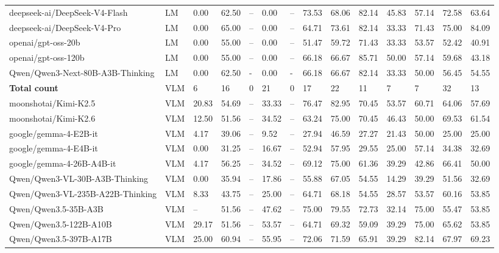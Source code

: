 \begin{table}[htbp!]
\begin{adjustbox}{max width=\textwidth}
\begin{tabular}{llllllllllllll}
deepseek-ai/DeepSeek-V4-Flash & LM & 0.00  & 62.50 & -- & 0.00 & -- & 73.53 & 68.06 & 82.14 & 45.83 & 57.14 & 72.58 & 63.64    \\
deepseek-ai/DeepSeek-V4-Pro & LM & 0.00 & 65.00 & -- & 0.00 & -- & 64.71 & 73.61 & 82.14 & 33.33 & 71.43 & 75.00 & 84.09   \\
openai/gpt-oss-20b & LM & 0.00 & 55.00 & -- & 0.00 & -- & 51.47 & 59.72 & 71.43 & 33.33 & 53.57 & 52.42 & 40.91  \\
openai/gpt-oss-120b & LM & 0.00 & 55.00 & -- & 0.00 & -- & 66.18 & 66.67 & 85.71 & 50.00 & 57.14 & 59.68 & 43.18   \\
Qwen/Qwen3-Next-80B-A3B-Thinking & LM & 0.00 & 62.50 & - & 0.00 & -  & 66.18 & 66.67 & 82.14 & 33.33 & 50.00 & 56.45 & 54.55   \\
\midrule
\bf Total count & VLM & 6 & 16 & 0 & 21 & 0 & 17 & 22 & 11 & 7 & 7 & 32 & 13   \\
\hdashline
moonshotai/Kimi-K2.5 & VLM & 20.83 & 54.69 & -- & 33.33 & -- & 76.47 & 82.95 & 70.45 & 53.57 & 60.71 & 64.06 & 57.69 \\
moonshotai/Kimi-K2.6 & VLM & 12.50 & 51.56 & -- & 34.52 & -- & 63.24 & 75.00 & 70.45 & 46.43 & 50.00 & 69.53 & 61.54    \\
google/gemma-4-E2B-it & VLM & 4.17 & 39.06 & -- & 9.52 & -- & 27.94 & 46.59 & 27.27 & 21.43 & 50.00 & 25.00 & 25.00    \\
google/gemma-4-E4B-it & VLM & 0.00 & 31.25 & -- & 16.67 & -- & 52.94 & 57.95 & 29.55 & 25.00 & 57.14 & 34.38 & 32.69  \\
google/gemma-4-26B-A4B-it & VLM & 4.17 & 56.25 & -- & 34.52 & -- & 69.12 & 75.00 & 61.36 & 39.29 & 42.86 & 66.41 & 50.00  \\
Qwen/Qwen3-VL-30B-A3B-Thinking & VLM & 0.00 & 35.94 & -- & 17.86 & -- & 55.88 & 67.05 & 54.55 & 14.29 & 39.29 & 51.56 & 32.69  \\
Qwen/Qwen3-VL-235B-A22B-Thinking & VLM & 8.33 & 43.75 & -- & 25.00 & -- & 64.71 & 68.18 & 54.55 & 28.57 & 53.57 & 60.16 & 53.85  \\
Qwen/Qwen3.5-35B-A3B & VLM & -- & 51.56 & -- & 47.62 & -- & 75.00 & 79.55 & 72.73 & 32.14 & 75.00 & 55.47 & 53.85  \\
Qwen/Qwen3.5-122B-A10B & VLM & 29.17 & 51.56 & -- & 53.57 & -- & 64.71 & 69.32 & 59.09 & 39.29 & 75.00 & 65.62 & 53.85   \\
Qwen/Qwen3.5-397B-A17B & VLM & 25.00 & 60.94 & -- & 55.95 & -- & 72.06 & 71.59 & 65.91 & 39.29 & 82.14 & 67.97 & 69.23  \\

\end{tabular}
\end{adjustbox}
\end{table}
